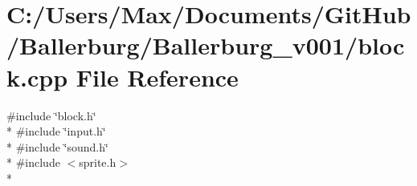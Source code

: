 \section{C\+:/\+Users/\+Max/\+Documents/\+Git\+Hub/\+Ballerburg/\+Ballerburg\+\_\+v001/block.cpp File Reference}
\label{block_8cpp}
{\ttfamily \#include \char`\"{}block.\+h\char`\"{}}\\*
{\ttfamily \#include \char`\"{}input.\+h\char`\"{}}\\*
{\ttfamily \#include \char`\"{}sound.\+h\char`\"{}}\\*
{\ttfamily \#include $<$sprite.\+h$>$}\\*
